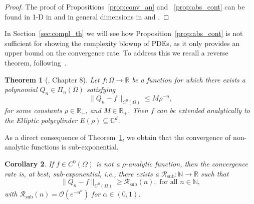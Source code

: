 \documentclass[pdflatex]{sn-jnl}%
\newtheorem{theorem}{Theorem}[section]%
\newtheorem{corollary}[theorem]{Corollary}
\begin{document}
\vspace{-1em}\begin{proof}
    The proof of Propositions~\ref{prop:conv_an} and ~\ref{prop:abs_cont} can be found in 1-D in \cite{Trefethen2017_mD} and in general dimensions in \cite{Suarez2025} and \cite{zavalani2024}.
\end{proof}
In Section~\ref{sec:compl_th} we will see how Proposition~\ref{prop:abs_cont} is not sufficient for showing the complexity blowup of PDEs, as it only provides an upper bound on the convergence rate. To address this we recall a reverse theorem, following~\cite{Trefethen2019, Alimov2019-np}. 
\begin{theorem}[\cite{Trefethen2019}, Chapter 8]\label{thm:blowup}
    Let $f:\Omega\rightarrow \mathbb{R}$ be a function for which there exists a polynomial $Q_n\in \Pi_{n}(\Omega)$ satisfying
    \begin{equation}
        \|Q_n-f\|_{C^0(\Omega)}\leq M\rho ^{-n},
    \end{equation}
    for some constants $\rho\in \mathbb{R}_+$, and $M\in \mathbb{R}_+$. Then $f$ can be extended analytically to the Elliptic polycylinder $E(\rho)\subseteq \mathbb{C}^{d}$.
\end{theorem}
As a direct consequence of Theorem~\ref{thm:blowup}, we obtain that the convergence of non-analytic functions is sub-exponential. 
\begin{corollary}\label{cor:onlyif_an}
    If $f\in C^0(\Omega)$ is not a $\rho$-analytic function, then the convergence rate is, at best, sub-exponential, i.e., there exists a $\mathcal{R}_{\mathrm{sub}}:\mathbb{N}\rightarrow\mathbb{R}$ such that 
    \begin{equation}
        \|Q_n-f\|_{C^0(\Omega)}\geq\mathcal{R}_{\mathrm{sub}}(n),\textrm{ for all } n\in \mathbb{N,}
    \end{equation}
    with $\mathcal{R}_{\mathrm{sub}}(n) =\mathcal{O}(e^{-n^\alpha})$ for $\alpha\in (0,1)$.
\end{corollary}
\end{document}
